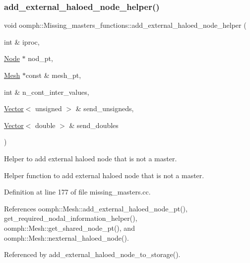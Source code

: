 \subsubsection{\texorpdfstring{add\+\_\+external\+\_\+haloed\+\_\+node\+\_\+helper()}{add\_external\_haloed\_node\_helper()}}
{\footnotesize\ttfamily void oomph\+::\+Missing\+\_\+masters\+\_\+functions\+::add\+\_\+external\+\_\+haloed\+\_\+node\+\_\+helper (\begin{DoxyParamCaption}\item[{int \&}]{iproc,  }\item[{\hyperlink{classoomph_1_1Node}{Node} $\ast$}]{nod\+\_\+pt,  }\item[{\hyperlink{classoomph_1_1Mesh}{Mesh} $\ast$const \&}]{mesh\+\_\+pt,  }\item[{int \&}]{n\+\_\+cont\+\_\+inter\+\_\+values,  }\item[{\hyperlink{classoomph_1_1Vector}{Vector}$<$ unsigned $>$ \&}]{send\+\_\+unsigneds,  }\item[{\hyperlink{classoomph_1_1Vector}{Vector}$<$ double $>$ \&}]{send\+\_\+doubles }\end{DoxyParamCaption})}



Helper to add external haloed node that is not a master. 

Helper function to add external haloed node that is not a master. 

Definition at line 177 of file missing\+\_\+masters.\+cc.



References oomph\+::\+Mesh\+::add\+\_\+external\+\_\+haloed\+\_\+node\+\_\+pt(), get\+\_\+required\+\_\+nodal\+\_\+information\+\_\+helper(), oomph\+::\+Mesh\+::get\+\_\+shared\+\_\+node\+\_\+pt(), and oomph\+::\+Mesh\+::nexternal\+\_\+haloed\+\_\+node().



Referenced by add\+\_\+external\+\_\+haloed\+\_\+node\+\_\+to\+\_\+storage().

\mbox{\label{namespaceoomph_1_1Missing__masters__functions_a94805dfb28ba45ff7f4d7a0d6fef108d}} 
